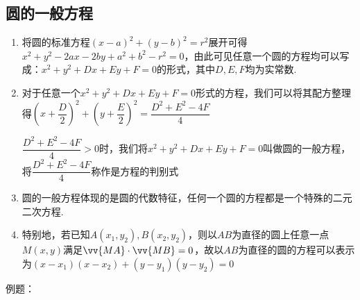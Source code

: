 \subsection*{圆的一般方程}
\begin{enumerate}
    \item 将圆的标准方程$(x-a)^2+(y-b)^2 = r^2$展开可得$x^2+y^2-2ax-2by+a^2+b^2-r^2 = 0$，由此可见任意一个圆的方程均可以写成：$x^2+y^2+Dx+Ey+F = 0$的形式，其中$D,E,F$均为实常数.
    \item 对于任意一个$x^2+y^2+Dx+Ey+F = 0$形式的方程，我们可以将其配方整理得$\left(x + \dfrac{D}{2}\right)^2+\left(y+\dfrac{E}{2}\right)^2 = \dfrac{D^2+E^2-4F}{4}$
    $\dfrac{D^2+E^2-4F}{4} > 0$时，我们将$x^2+y^2+Dx+Ey+F = 0$叫做圆的一般方程，将$\dfrac{D^2+E^2-4F}{4}$称作是方程的判别式
    \item 圆的一般方程体现的是圆的代数特征，任何一个圆的方程都是一个特殊的二元二次方程.
    \item 特别地，若已知$A(x_1, y_2), B(x_2, y_2)$，则以$AB$为直径的圆上任意一点$M(x, y)$满足$\vv{MA} \cdot \vv{MB} = 0$，故以$AB$为直径的圆的方程可以表示为$(x-x_1)(x-x_2) + (y-y_1)(y-y_2) = 0$
\end{enumerate}
例题：
